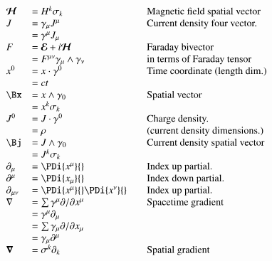 \documentclass{article}
\newcommand{\EE}[0]{\boldsymbol{\mathcal{E}}}
\newcommand{\HH}[0]{\boldsymbol{\mathcal{H}}}
\begin{document}
\begin{equation*}
\begin{array}{l l l}
\HH &= H^k \sigma_k & \quad \mbox{Magnetic field spatial vector} \\
J &= \gamma_{\mu} J^{\mu} & \quad \mbox{Current density four vector.} \\
  &= \gamma^{\mu} J_{\mu} \\
F &= \EE + i \HH & \quad \mbox{Faraday bivector} \\
  &= F^{\mu\nu} \gamma_\mu \wedge \gamma_\nu & \quad \mbox{in terms of Faraday tensor} \\
x^{0} &= x \cdot \gamma^0 & \quad \mbox{Time coordinate (length dim.)} \\
      &= c t \\
\Bx &= x \wedge \gamma_0 & \quad \mbox{Spatial vector} \\
    &= x^k \sigma_k \\
J^{0} &= J \cdot \gamma^0 & \quad \mbox{Charge density.} \\
      &= \rho & \quad \mbox{(current density dimensions.)} \\
\Bj &= J \wedge \gamma_0 & \quad \mbox{Current density spatial vector} \\
    &= J^k \sigma_k \\ %
% 
\partial_{\mu} &= \PDi{x^\mu}{} & \quad \mbox{Index up partial.} \\
\partial^{\mu} &= \PDi{x_\mu}{} & \quad \mbox{Index down partial.} \\
\partial_{\mu\nu} &= \PDi{x^\mu}{}\PDi{x^\nu}{} & \quad \mbox{Index up partial.} \\
\grad &= \sum \gamma^{\mu} \partial/\partial {x^{\mu}} & \quad \mbox{Spacetime gradient} \\
      &= \gamma^{\mu}\partial_{\mu} \\
      &= \sum \gamma_{\mu} \partial/\partial {x_{\mu}} \\
      &= \gamma_{\mu}\partial^{\mu} \\
\spacegrad &= \sigma^{k} \partial_k & \quad \mbox{Spatial gradient} \\

\end{array}
\end{equation*}
\end{document}
